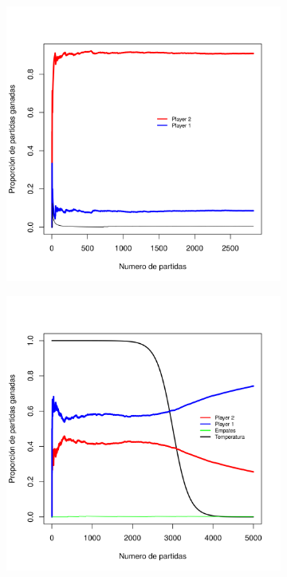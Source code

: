 \documentclass[11pt, spanish]{article}
\begin{document}
\begin{figure}[H]
    \centering
    \begin{subfigure}[b]{0.45\textwidth}
      \includegraphics[width=\textwidth]{Imagenes/SinVision_luchaNoLibre_QsinVison_reverse}
    \end{subfigure}
    \caption{}
\end{figure}

\begin{figure}[H]
    \centering
    \begin{subfigure}[b]{0.45\textwidth}
      \includegraphics[width=\textwidth]{Imagenes/SinVision_disipacion_QsinVison}
    \end{subfigure}
\end{figure}
\end{document}
